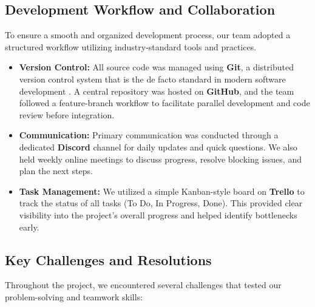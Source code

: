\subsection{Development Workflow and Collaboration}
To ensure a smooth and organized development process, our team adopted a structured workflow utilizing industry-standard tools and practices.

\begin{itemize}
	\item \textbf{Version Control:} All source code was managed using \textbf{Git}, a distributed version control system that is the de facto standard in modern software development \cite{Chacon2014}. A central repository was hosted on \textbf{GitHub}, and the team followed a feature-branch workflow to facilitate parallel development and code review before integration.

	\item \textbf{Communication:} Primary communication was conducted through a dedicated \textbf{Discord} channel for daily updates and quick questions. We also held weekly online meetings to discuss progress, resolve blocking issues, and plan the next steps.

	\item \textbf{Task Management:} We utilized a simple Kanban-style board on \textbf{Trello} to track the status of all tasks (To Do, In Progress, Done). This provided clear visibility into the project's overall progress and helped identify bottlenecks early.
\end{itemize}

\subsection{Key Challenges and Resolutions}
Throughout the project, we encountered several challenges that tested our problem-solving and teamwork skills:

